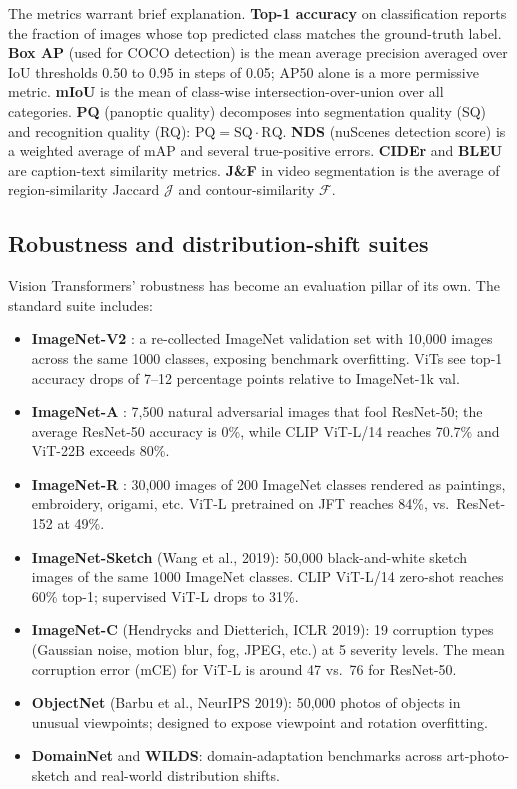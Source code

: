 \documentclass{article}
\begin{document}
The metrics warrant brief explanation. \textbf{Top-1 accuracy} on classification reports the fraction of images whose top predicted class matches the ground-truth label. \textbf{Box AP} (used for COCO detection) is the mean average precision averaged over IoU thresholds 0.50 to 0.95 in steps of 0.05; AP50 alone is a more permissive metric. \textbf{mIoU} is the mean of class-wise intersection-over-union over all categories. \textbf{PQ} (panoptic quality) decomposes into segmentation quality (SQ) and recognition quality (RQ): \(\mathrm{PQ} = \mathrm{SQ} \cdot \mathrm{RQ}\). \textbf{NDS} (nuScenes detection score) is a weighted average of mAP and several true-positive errors. \textbf{CIDEr} and \textbf{BLEU} are caption-text similarity metrics. \textbf{J\&F} in video segmentation is the average of region-similarity Jaccard \(\mathcal{J}\) and contour-similarity \(\mathcal{F}\).

\subsection{Robustness and distribution-shift suites}\label{robustness-and-distribution-shift-suites}

Vision Transformers' robustness has become an evaluation pillar of its own. The standard suite includes:

\begin{itemize}

\item
  \textbf{ImageNet-V2} \citep{recht2019doimagenetclassifi}: a re-collected ImageNet validation set with 10,000 images across the same 1000 classes, exposing benchmark overfitting. ViTs see top-1 accuracy drops of 7--12 percentage points relative to ImageNet-1k val.
\item
  \textbf{ImageNet-A} \citep{hendrycks2021themanyfacesofrobu}: 7,500 natural adversarial images that fool ResNet-50; the average ResNet-50 accuracy is 0\%, while CLIP ViT-L/14 reaches 70.7\% and ViT-22B exceeds 80\%.
\item
  \textbf{ImageNet-R} \citep{hendrycks2021themanyfacesofrobu}: 30,000 images of 200 ImageNet classes rendered as paintings, embroidery, origami, etc. ViT-L pretrained on JFT reaches 84\%, vs.~ResNet-152 at 49\%.
\item
  \textbf{ImageNet-Sketch} (Wang et al., 2019): 50,000 black-and-white sketch images of the same 1000 ImageNet classes. CLIP ViT-L/14 zero-shot reaches 60\% top-1; supervised ViT-L drops to 31\%.
\item
  \textbf{ImageNet-C} (Hendrycks and Dietterich, ICLR 2019): 19 corruption types (Gaussian noise, motion blur, fog, JPEG, etc.) at 5 severity levels. The mean corruption error (mCE) for ViT-L is around 47 vs.~76 for ResNet-50.
\item
  \textbf{ObjectNet} (Barbu et al., NeurIPS 2019): 50,000 photos of objects in unusual viewpoints; designed to expose viewpoint and rotation overfitting.
\item
  \textbf{DomainNet} and \textbf{WILDS}: domain-adaptation benchmarks across art-photo-sketch and real-world distribution shifts.
\end{itemize}
\end{document}
